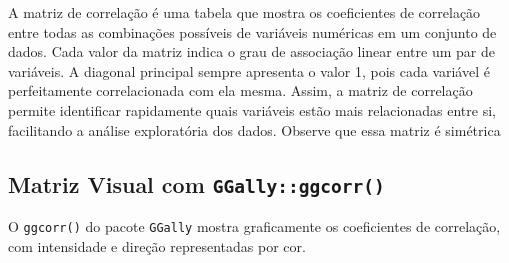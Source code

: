 \documentclass[
]{book}
\begin{document}
A matriz de correlação é uma tabela que mostra os coeficientes de correlação entre todas as combinações possíveis de variáveis numéricas em um conjunto de dados. Cada valor da matriz indica o grau de associação linear entre um par de variáveis. A diagonal principal sempre apresenta o valor 1, pois cada variável é perfeitamente correlacionada com ela mesma. Assim, a matriz de correlação permite identificar rapidamente quais variáveis estão mais relacionadas entre si, facilitando a análise exploratória dos dados. Observe que essa matriz é simétrica

\subsection{\texorpdfstring{Matriz Visual com \texttt{GGally::ggcorr()}}{Matriz Visual com GGally::ggcorr()}}\label{matriz-visual-com-ggallyggcorr}

O \texttt{ggcorr()} do pacote \texttt{GGally} mostra graficamente os coeficientes de correlação, com intensidade e direção representadas por cor.
\end{document}
